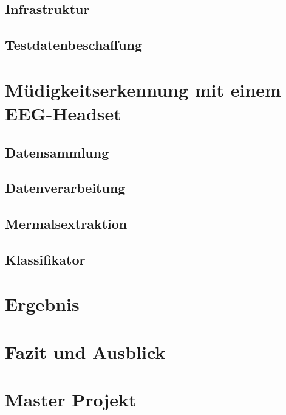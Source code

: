 \section{Infrastruktur}


\section{Testdatenbeschaffung}



\chapter{Müdigkeitserkennung mit einem EEG-Headset}


\section{Datensammlung}


\section{Datenverarbeitung}


\section{Mermalsextraktion}


\section{Klassifikator}



\chapter{Ergebnis}


\chapter{Fazit und Ausblick}


\chapter{Master Projekt}


\cleardoublepage 


\cleardoublepage


